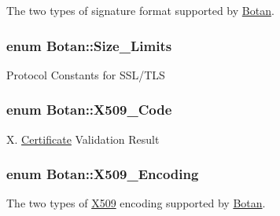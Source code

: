 The two types of signature format supported by \hyperlink{namespaceBotan}{Botan}. \hypertarget{namespaceBotan_af1fb5604c83d2556129a7c04045197f4}{
\subsubsection[{Size\-\_\-\-Limits}]{\setlength{\rightskip}{0pt plus 5cm}enum {\bf Botan\-::\-Size\-\_\-\-Limits}}}\label{namespaceBotan_af1fb5604c83d2556129a7c04045197f4}
Protocol Constants for S\-S\-L/\-T\-L\-S \hypertarget{namespaceBotan_a4ff69afd30e1161d59676bae61c86ab5}{
\subsubsection[{X509\-\_\-\-Code}]{\setlength{\rightskip}{0pt plus 5cm}enum {\bf Botan\-::\-X509\-\_\-\-Code}}}\label{namespaceBotan_a4ff69afd30e1161d59676bae61c86ab5}
X. \hyperlink{classBotan_1_1Certificate}{Certificate} Validation Result \hypertarget{namespaceBotan_a53759b4ed1fb93549f307fcf68729d2f}{
\subsubsection[{X509\-\_\-\-Encoding}]{\setlength{\rightskip}{0pt plus 5cm}enum {\bf Botan\-::\-X509\-\_\-\-Encoding}}}\label{namespaceBotan_a53759b4ed1fb93549f307fcf68729d2f}
The two types of \hyperlink{namespaceBotan_1_1X509}{X509} encoding supported by \hyperlink{namespaceBotan}{Botan}. 

